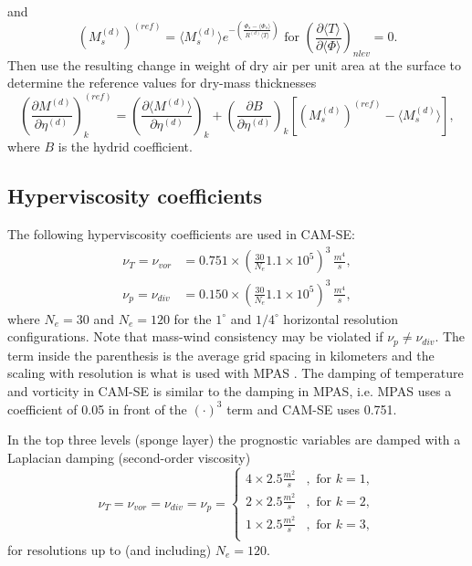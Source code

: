 \documentclass{agujournal}
\begin{document}
{\begin{equation}
\end{equation}
and
\begin{equation}
\left( M^{(d)}_s \right)^{(ref)}=\langle M^{(d)}_s \rangle e^{-\left( \frac{\Phi_s-\langle \Phi_s\rangle}{R^{(d)}\langle T \rangle}\right)}\text{ for }\left( \frac{\partial \langle T\rangle}{\partial \langle \Phi \rangle}\right)_{nlev}= 0.
\end{equation}
Then use the resulting change in weight of dry air per unit area at the surface to determine the reference values for dry-mass thicknesses
\begin{equation}
\left( \frac{\partial M^{(d)}}{\partial \eta^{(d)}}\right)^{(ref)}_k=\left( \frac{\partial \langle M^{(d)}\rangle}{\partial \eta^{(d)}}\right)_k+\left( \frac{\partial B}{\partial \eta^{(d)}}\right)_k\left[ \left( M^{(d)}_s \right)^{(ref)}-\langle M^{(d)}_s \rangle \right],
\end{equation}
where $B$ is the hydrid coefficient.
%
%
% 
\subsection{Hyperviscosity coefficients}\label{app:nu}
The following hyperviscosity coefficients are used in CAM-SE:
\begin{align}
\nu_T = \nu_{vor} &= 0.751\times \left(\frac{30}{N_e}1.1\times 10^5\right)^3\, \frac{m^4}{s},\\
\nu_p = \nu_{div} &= 0.150\times \left(\frac{30}{N_e}1.1\times 10^5\right)^3\, \frac{m^4}{s},
\end{align}
where $N_e=30$ and $N_e=120$ for the $1^\circ$ and $1/4^{\circ}$ horizontal resolution configurations. Note that mass-wind consistency may be violated if $\nu_p \neq \nu_{div}$. The term inside the parenthesis is the average grid spacing in kilometers and the scaling with resolution is what is used with MPAS \citep[Model for Prediction Across Scales; ][]{SPKS2014JAS}. The damping of temperature and vorticity in CAM-SE is similar to the damping in MPAS, i.e. MPAS uses a coefficient of 0.05 in front of the $(\cdot)^3$ term and CAM-SE uses 0.751.

In the top three levels (sponge layer) the prognostic variables are damped with a Laplacian damping (second-order viscosity)
\begin{equation}
\nu_T = \nu_{vor} = \nu_{div} = \nu_p = 
\begin{cases}
4\times 2.5 \frac{m^2}{s}&, \text{ for }k=1,\\
2\times 2.5 \frac{m^2}{s}&, \text{ for }k=2,\\
1\times 2.5 \frac{m^2}{s}&, \text{ for }k=3,\\
\end{cases}
\end{equation}
for resolutions up to (and including) $N_e=120$.
%
}
\end{document}
